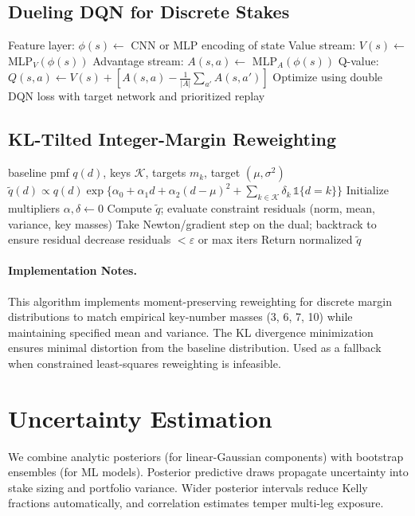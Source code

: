 \subsection{Dueling DQN for Discrete Stakes}
\begin{algorithm}[H]
\caption{Dueling DQN Architecture}
\begin{algorithmic}[1]
\State Feature layer: $\phi(s) \gets$ CNN or MLP encoding of state
\State Value stream: $V(s) \gets$ MLP$_V(\phi(s))$
\State Advantage stream: $A(s,a) \gets$ MLP$_A(\phi(s))$
\State Q-value: $Q(s,a) \gets V(s) + \left[A(s,a) - \frac{1}{|A|}\sum_{a'} A(s,a')\right]$
\State Optimize using double DQN loss with target network and prioritized replay
\end{algorithmic}
\end{algorithm}

\subsection{KL-Tilted Integer-Margin Reweighting}
\begin{algorithm}[H]
\caption{KL-Tilted Integer-Margin Reweighting}
\label{alg:kl-tilt}
\begin{algorithmic}[1]
\Require baseline pmf $q(d)$, keys $\mathcal{K}$, targets $m_k$, target $(\mu,\sigma^2)$
\Ensure $\tilde{q}(d) \propto q(d)\exp\{\alpha_0+\alpha_1 d+\alpha_2 (d-\mu)^2+\sum_{k\in\mathcal{K}}\delta_k\,\mathbb{1}\{d=k\}\}$
\State Initialize multipliers $\alpha,\delta \leftarrow 0$
\Repeat
  \State Compute $\tilde{q}$; evaluate constraint residuals (norm, mean, variance, key masses)
  \State Take Newton/gradient step on the dual; backtrack to ensure residual decrease
\Until residuals $< \varepsilon$ or max iters
\State Return normalized $\tilde{q}$
\end{algorithmic}
\end{algorithm}

\paragraph{Implementation Notes.}
This algorithm implements moment-preserving reweighting for discrete margin distributions to match empirical key-number masses (3, 6, 7, 10) while maintaining specified mean and variance. The KL divergence minimization ensures minimal distortion from the baseline distribution. Used as a fallback when constrained least-squares reweighting is infeasible.

\section{Uncertainty Estimation}\label{app:uncertainty}
We combine analytic posteriors (for linear-Gaussian components) with bootstrap ensembles (for ML models). Posterior predictive draws propagate uncertainty into stake sizing and portfolio variance. Wider posterior intervals reduce Kelly fractions automatically, and correlation estimates temper multi-leg exposure.


